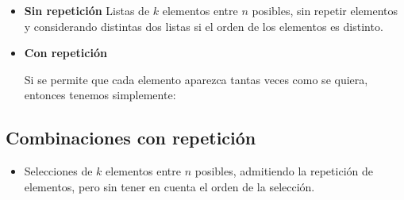 \begin{itemize}

\item {\bf Sin repetici\'on} Listas de $k$ elementos entre $n$ posibles, sin repetir
elementos y considerando distintas dos listas si el orden de los elementos es distinto.

\item {\bf Con repetici\'on}

Si se permite que cada elemento aparezca tantas veces como se quiera, entonces tenemos simplemente:

\end{itemize}

\subsection{Combinaciones con repetici\'on}


\begin{itemize}

\item Selecciones de $k$ elementos entre $n$ posibles, admitiendo la repetici\'on de elementos, pero sin tener en cuenta el orden de la selecci\'on.

\end{itemize}



%


